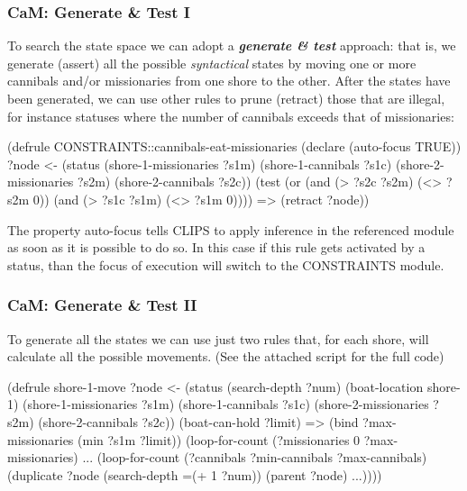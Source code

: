 \documentclass[xcolor={usenames,dvipsnames,svgnames}, compress]{beamer}
\begin{document}
\begin{frame}[fragile]
  \frametitle{CaM: Generate \& Test I}
  To search the state space we can adopt a \textbf{\emph{generate \&
      test}} approach: that is, we generate (assert) all the possible
  \emph{syntactical} states by moving one or more cannibals and/or
  missionaries from one shore to the other. After the states have been
  generated, we can use other rules to prune (retract) those that are
  illegal, for instance statuses where the number of cannibals exceeds
  that of missionaries:
  \begin{clips-code}[numbers=none]
    (defrule CONSTRAINTS::cannibals-eat-missionaries
         (declare (auto-focus TRUE))
         ?node <- (status (shore-1-missionaries ?s1m)
         (shore-1-cannibals ?s1c)
         (shore-2-missionaries ?s2m)
         (shore-2-cannibals ?s2c))
         (test (or (and (> ?s2c ?s2m) (<> ?s2m 0))
                   (and (> ?s1c ?s1m) (<> ?s1m 0))))
         =>
         (retract ?node))
  \end{clips-code}
  The property \textsf{auto-focus} tells CLIPS to apply inference in
  the referenced module as soon as it is possible to do so. In this
  case if this rule gets activated by a status, than the focus of
  execution will switch to the CONSTRAINTS module.
\end{frame}

\begin{frame}[fragile]
  \frametitle{CaM: Generate \& Test II}
  To generate all the states we can use just two rules that, for each
  shore, will calculate all the possible movements. (See the attached
  script for the full code)
  \begin{clips-code}[numbers=none]
    (defrule shore-1-move 
        ?node <- (status (search-depth ?num) 
                         (boat-location shore-1)
                         (shore-1-missionaries ?s1m)
                         (shore-1-cannibals ?s1c)
                         (shore-2-missionaries ?s2m)
                         (shore-2-cannibals ?s2c))
                         (boat-can-hold ?limit)
        =>
        (bind ?max-missionaries (min ?s1m ?limit))
        (loop-for-count (?missionaries 0 ?max-missionaries)
                        ...
                        (loop-for-count (?cannibals ?min-cannibals ?max-cannibals)
                                        (duplicate ?node (search-depth =(+ 1 ?num))
                                                         (parent ?node)
                                                         ...))))
  \end{clips-code}
\end{frame}
\end{document}
